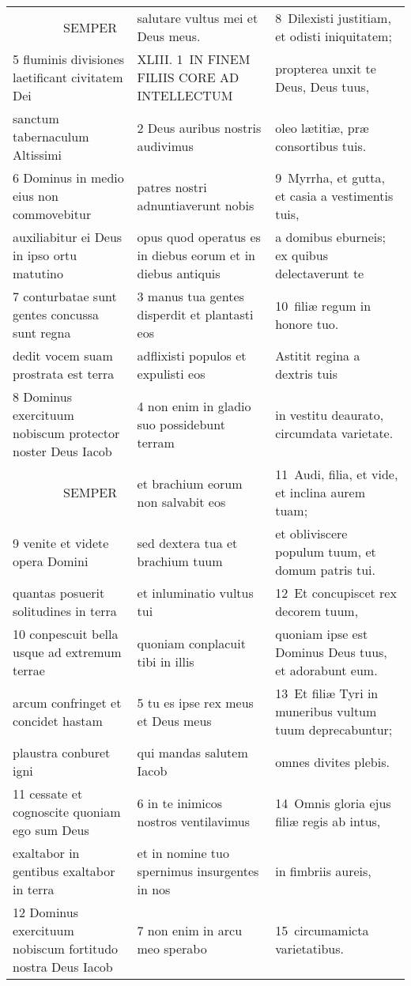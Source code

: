 \documentclass{article}
\begin{document}
\begin{longtable}{@{}p{}p{}p{}@{}}
    SEMPER	&	salutare vultus mei et Deus meus.	&	8 Dilexisti justitiam, et odisti iniquitatem;	\\
5 fluminis divisiones laetificant civitatem Dei	&	XLIII. 1 IN FINEM FILIIS CORE AD INTELLECTUM	&	propterea unxit te Deus, Deus tuus,	\\
sanctum tabernaculum Altissimi	&	2 Deus auribus nostris audivimus	&	oleo lætitiæ, præ consortibus tuis.	\\
6 Dominus in medio eius non commovebitur	&	patres nostri adnuntiaverunt nobis	&	9 Myrrha, et gutta, et casia a vestimentis tuis,	\\
auxiliabitur ei Deus in ipso ortu matutino	&	opus quod operatus es in diebus eorum et in diebus antiquis	&	a domibus eburneis; ex quibus delectaverunt te	\\
7 conturbatae sunt gentes concussa sunt regna	&	3 manus tua gentes disperdit et plantasti eos	&	10 filiæ regum in honore tuo.	\\
dedit vocem suam prostrata est terra	&	adflixisti populos et expulisti eos	&	Astitit regina a dextris tuis	\\
8 Dominus exercituum nobiscum protector noster Deus Iacob	&	4 non enim in gladio suo possidebunt terram	&	in vestitu deaurato, circumdata varietate.	\\
    SEMPER	&	et brachium eorum non salvabit eos	&	11 Audi, filia, et vide, et inclina aurem tuam;	\\
9 venite et videte opera Domini	&	sed dextera tua et brachium tuum	&	et obliviscere populum tuum, et domum patris tui.	\\
quantas posuerit solitudines in terra	&	et inluminatio vultus tui	&	12 Et concupiscet rex decorem tuum,	\\
10 conpescuit bella usque ad extremum terrae	&	quoniam conplacuit tibi in illis	&	quoniam ipse est Dominus Deus tuus, et adorabunt eum.	\\
arcum confringet et concidet hastam	&	5 tu es ipse rex meus et Deus meus	&	13 Et filiæ Tyri in muneribus vultum tuum deprecabuntur;	\\
plaustra conburet igni	&	qui mandas salutem Iacob	&	omnes divites plebis.	\\
11 cessate et cognoscite quoniam ego sum Deus	&	6 in te inimicos nostros ventilavimus	&	14 Omnis gloria ejus filiæ regis ab intus,	\\
exaltabor in gentibus exaltabor in terra	&	et in nomine tuo spernimus insurgentes in nos	&	in fimbriis aureis,	\\
12 Dominus exercituum nobiscum fortitudo nostra Deus Iacob	&	7 non enim in arcu meo sperabo	&	15 circumamicta varietatibus.	\\

\end{longtable}
\end{document}
